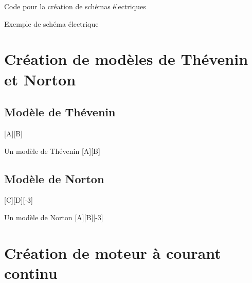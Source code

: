   \begin{Latex}{Code pour la création de schémas électriques}
    \begin{schema} {Exemple de schéma électrique}
  
    
    
      \resetColors
              
    
      \resetColors
    
  
    
    
    
    
              
    \end{schema}
  \end{Latex}
  

\section{Création de modèles de Thévenin et Norton}


\subsection{Modèle de Thévenin}

[A][B]

\begin{Latex}{Un modèle de Thévenin}
  [A][B]
\end{Latex}

\subsection{Modèle de Norton}

[C][D][-3]

\begin{Latex}{Un modèle de Norton}
  [A][B][-3]
\end{Latex}

\section{Création de moteur à courant continu}



